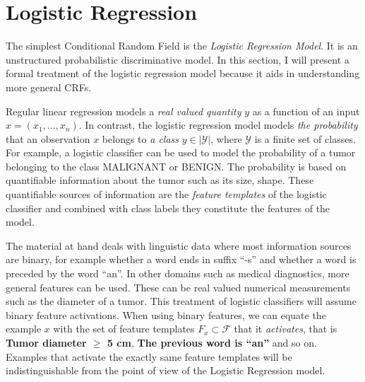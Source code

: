 \section{Logistic Regression}

The simplest Conditional Random Field is the {\it Logistic Regression
  Model}. It is an unstructured probabilistic discriminative
model. In this section, I will present a formal treatment of the
logistic regression model because it aids in understanding more general
CRFs.

Regular linear regression models a {\it real valued quantity} $y$ as a
function of an input $x = (x_1, ..., x_n)$. In contrast, the logistic
regression model models {\it the probability} that an observation $x$
belongs to {\it a class} $y \in |\mathcal{Y}|$, where $\mathcal{Y}$ is
a finite set of classes. For example, a logistic classifier can be
used to model the probability of a tumor belonging to the class {\sc
  MALIGNANT} or BENIGN. The probability is based on quantifiable
information about the tumor such as its size, shape. These quantifiable
sources of information are the {\it feature templates} of the logistic
classifier and combined with class labels they constitute the features of
the
model. %

The material at hand deals with linguistic data where most information
sources are binary, for example whether a word ends in suffix ``-s''
and whether a word is preceded by the word ``an''. In other domains
such as medical diagnostics, more general features can be used. These
can be real valued numerical measurements such as the diameter of a
tumor. This treatment of logistic classifiers will assume binary
feature activations. When using binary features, we can equate the example $x$
with the set of feature templates $F_x \subset \mathcal{F}$ that it {\it
  activates}, that is {\bf Tumor diameter $\geq$ 5 cm}, {\bf The previous word is ``an''} and so on. Examples that activate the exactly same
feature templates will be indistinguishable from the point of view of the
Logistic Regression model.


